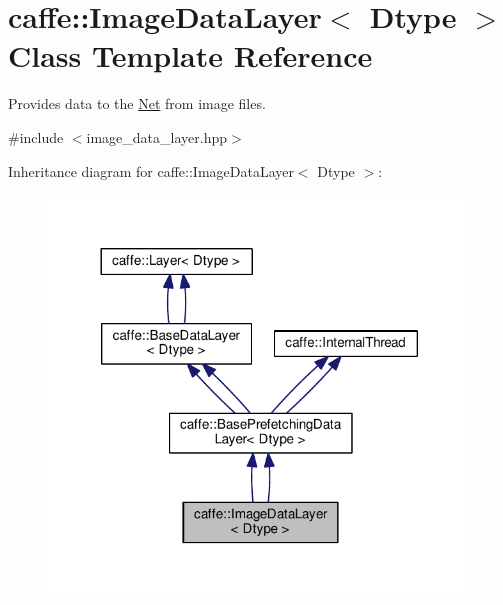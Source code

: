\hypertarget{classcaffe_1_1_image_data_layer}{}\section{caffe\+:\+:Image\+Data\+Layer$<$ Dtype $>$ Class Template Reference}
\label{classcaffe_1_1_image_data_layer}


Provides data to the \mbox{\hyperlink{classcaffe_1_1_net}{Net}} from image files.  




{\ttfamily \#include $<$image\+\_\+data\+\_\+layer.\+hpp$>$}



Inheritance diagram for caffe\+:\+:Image\+Data\+Layer$<$ Dtype $>$\+:
\nopagebreak
\begin{figure}[H]
\begin{center}
\leavevmode
\includegraphics[width=317pt]{classcaffe_1_1_image_data_layer__inherit__graph}
\end{center}
\end{figure}

